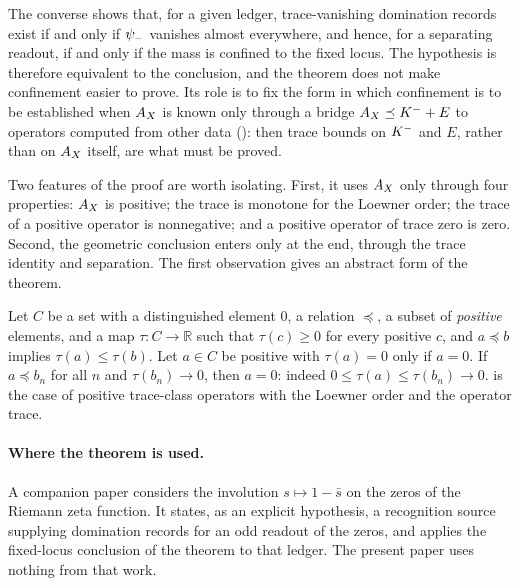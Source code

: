 The converse shows that, for a given ledger, trace-vanishing domination
records exist if and only if \(\psi_{-}\) vanishes almost everywhere, and
hence, for a separating readout, if and only if the mass is confined to
the fixed locus.  The hypothesis is therefore equivalent to the
conclusion, and the theorem does not make confinement easier to prove.
Its role is to fix the form in which confinement is to be established
when \(A_{X}\) is known only through a bridge
\(A_{X}\preceq K^{-}+E\) to operators computed from other data
(): then trace bounds on \(K^{-}\) and \(E\),
rather than on \(A_{X}\) itself, are what must be proved.

Two features of the proof are worth isolating.  First, it uses \(A_{X}\)
only through four properties: \(A_{X}\) is positive; the trace is
monotone for the Loewner order; the trace of a positive operator is
nonnegative; and a positive operator of trace zero is zero.  Second,
the geometric conclusion enters only at the end, through the trace
identity and separation.  The first observation gives an abstract form
of the theorem.

\begin{remark}
\label{rem:duality_confinement:abstract-cone}
Let \(C\) be a set with a distinguished element \(0\), a relation
\(\preceq\), a subset of \emph{positive} elements, and a map
\(\tau:C\to\mathbb R\) such that \(\tau(c)\geq0\) for every positive
\(c\), and \(a\preceq b\) implies \(\tau(a)\leq\tau(b)\).
Let \(a\in C\) be positive with \(\tau(a)=0\) only if \(a=0\).  If
\(a\preceq b_n\) for all \(n\) and \(\tau(b_n)\to0\), then \(a=0\): indeed \(0\leq\tau(a)\leq\tau(b_n)\to0\).   is
the case of positive trace-class operators with the Loewner order and
the operator trace.
\end{remark}

\paragraph{Where the theorem is used.}
A companion paper \citep{TsiokosRHviaSDTC2026} considers the
involution \(s\mapsto1-\bar s\) on the zeros of the Riemann zeta
function.  It states, as an explicit hypothesis, a recognition source
supplying domination records for an odd readout of the zeros, and
applies the fixed-locus conclusion of the theorem to that ledger.  The
present paper uses nothing from that work.
